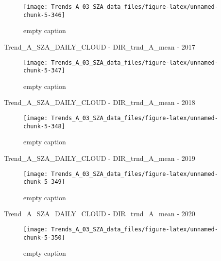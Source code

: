 \documentclass[
  10pt,
  a4paper,oneside]{article}
\begin{document}
\begin{figure}[!ht]

{\centering \texttt{[image: Trends\_A\_03\_SZA\_data\_files/figure-latex/unnamed-chunk-5-346]} 

}

\caption{ empty caption }\label{fig:unnamed-chunk-5-346}
\end{figure}

Trend\_A\_SZA\_DAILY\_CLOUD - DIR\_trnd\_A\_mean - 2017

\begin{figure}[!ht]

{\centering \texttt{[image: Trends\_A\_03\_SZA\_data\_files/figure-latex/unnamed-chunk-5-347]} 

}

\caption{ empty caption }\label{fig:unnamed-chunk-5-347}
\end{figure}

Trend\_A\_SZA\_DAILY\_CLOUD - DIR\_trnd\_A\_mean - 2018

\begin{figure}[!ht]

{\centering \texttt{[image: Trends\_A\_03\_SZA\_data\_files/figure-latex/unnamed-chunk-5-348]} 

}

\caption{ empty caption }\label{fig:unnamed-chunk-5-348}
\end{figure}

Trend\_A\_SZA\_DAILY\_CLOUD - DIR\_trnd\_A\_mean - 2019

\begin{figure}[!ht]

{\centering \texttt{[image: Trends\_A\_03\_SZA\_data\_files/figure-latex/unnamed-chunk-5-349]} 

}

\caption{ empty caption }\label{fig:unnamed-chunk-5-349}
\end{figure}

Trend\_A\_SZA\_DAILY\_CLOUD - DIR\_trnd\_A\_mean - 2020

\begin{figure}[!ht]

{\centering \texttt{[image: Trends\_A\_03\_SZA\_data\_files/figure-latex/unnamed-chunk-5-350]} 

}

\caption{ empty caption }\label{fig:unnamed-chunk-5-350}
\end{figure}
\end{document}
